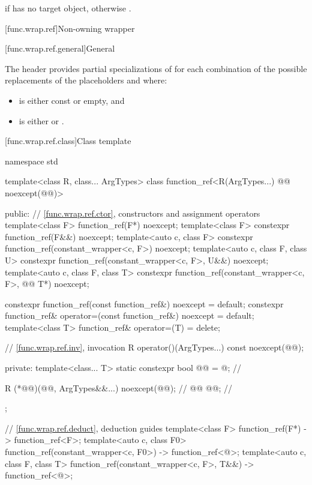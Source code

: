 \begin{itemdescr}
\pnum
\returns
{} if  has no target object, otherwise .
\end{itemdescr}

[func.wrap.ref]{Non-owning wrapper}

[func.wrap.ref.general]{General}

\pnum
The header provides partial specializations of 
for each combination of the possible replacements of
the placeholders \cv{} and  where:

\begin{itemize}
\item \cv{} is either const or empty, and
\item {} is either  or .
\end{itemize}

[func.wrap.ref.class]{Class template }

%
\begin{codeblock}
namespace std {
  template<class R, class... ArgTypes>
  class function_ref<R(ArgTypes...) @\cv{}@ noexcept(@@)> {
  public:
    // \ref{func.wrap.ref.ctor}, constructors and assignment operators
    template<class F> function_ref(F*) noexcept;
    template<class F> constexpr function_ref(F&&) noexcept;
    template<auto c, class F> constexpr function_ref(constant_wrapper<c, F>) noexcept;
    template<auto c, class F, class U>
      constexpr function_ref(constant_wrapper<c, F>, U&&) noexcept;
    template<auto c, class F, class T>
      constexpr function_ref(constant_wrapper<c, F>, @\cv{}@ T*) noexcept;

    constexpr function_ref(const function_ref&) noexcept = default;
    constexpr function_ref& operator=(const function_ref&) noexcept = default;
    template<class T> function_ref& operator=(T) = delete;

    // \ref{func.wrap.ref.inv}, invocation
    R operator()(ArgTypes...) const noexcept(@@);

  private:
    template<class... T>
      static constexpr bool @@ = @\seebelownc@;             // \expos

    R (*@@)(@@, ArgTypes&&...) noexcept(@@);      // \expos
    @@ @@;                                       // \expos
  };

  // \ref{func.wrap.ref.deduct}, deduction guides
  template<class F>
    function_ref(F*) -> function_ref<F>;
  template<auto c, class F0>
    function_ref(constant_wrapper<c, F0>) -> function_ref<@\seebelow@>;
  template<auto c, class F, class T>
    function_ref(constant_wrapper<c, F>, T&&) -> function_ref<@\seebelow@>;
}
\end{codeblock}

